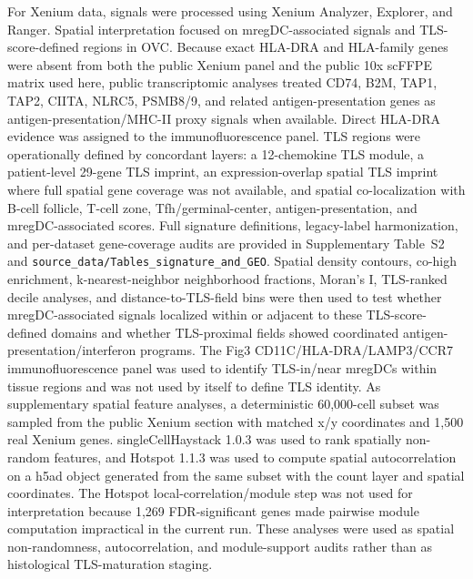 \documentclass[pdflatex,sn-vancouver-num]{sn-jnl}
\begin{document}
For Xenium data, signals were processed using Xenium Analyzer, Explorer, and Ranger. Spatial interpretation focused on mregDC-associated signals and TLS-score-defined regions in OVC. Because exact HLA-DRA and HLA-family genes were absent from both the public Xenium panel and the public 10x scFFPE matrix used here, public transcriptomic analyses treated CD74, B2M, TAP1, TAP2, CIITA, NLRC5, PSMB8/9, and related antigen-presentation genes as antigen-presentation/MHC-II proxy signals when available. Direct HLA-DRA evidence was assigned to the immunofluorescence panel. TLS regions were operationally defined by concordant layers: a 12-chemokine TLS module, a patient-level 29-gene TLS imprint, an expression-overlap spatial TLS imprint where full spatial gene coverage was not available, and spatial co-localization with B-cell follicle, T-cell zone, Tfh/germinal-center, antigen-presentation, and mregDC-associated scores. Full signature definitions, legacy-label harmonization, and per-dataset gene-coverage audits are provided in Supplementary Table~S2 and \texttt{source\_data/Tables\_signature\_and\_GEO}. Spatial density contours, co-high enrichment, k-nearest-neighbor neighborhood fractions, Moran's I, TLS-ranked decile analyses, and distance-to-TLS-field bins were then used to test whether mregDC-associated signals localized within or adjacent to these TLS-score-defined domains and whether TLS-proximal fields showed coordinated antigen-presentation/interferon programs. The Fig3 CD11C/HLA-DRA/LAMP3/CCR7 immunofluorescence panel was used to identify TLS-in/near mregDCs within tissue regions and was not used by itself to define TLS identity. As supplementary spatial feature analyses, a deterministic 60,000-cell subset was sampled from the public Xenium section with matched x/y coordinates and 1,500 real Xenium genes. singleCellHaystack 1.0.3 was used to rank spatially non-random features, and Hotspot 1.1.3 was used to compute spatial autocorrelation on a h5ad object generated from the same subset with the count layer and spatial coordinates. The Hotspot local-correlation/module step was not used for interpretation because 1,269 FDR-significant genes made pairwise module computation impractical in the current run. These analyses were used as spatial non-randomness, autocorrelation, and module-support audits rather than as histological TLS-maturation staging.
\end{document}
